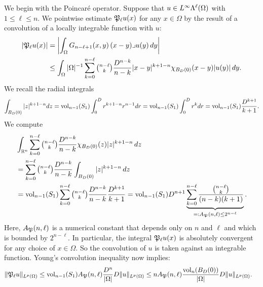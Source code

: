 \documentclass[12pt,a4paper]{article}
\begin{document}
We begin with the Poincar\'e operator. 
Suppose that $u \in L^{\infty}\Lambda^{\ell}(\Omega)$ with $1 \leq \ell \leq n$.
We pointwise estimate ${\mathfrak P}_{\ell} u(x)$ for any $x \in \Omega$ by the result of a convolution of a locally integrable function with $u$:
\begin{align*}
    \left| {\mathfrak P}_{\ell} u(x) \right|
    &=
    \left| 
        \int_{\Omega} G_{n-\ell+1}(x,y) \,(x-y)\lrcorner u(y)\,dy
    \right| 
    \\&\leq 
    \int_{\Omega} |\Omega|^{-1} \sum_{k=0}^{ n-\ell }\tbinom{ n-\ell }{k} \frac{ D^{n-k} }{n-k} |x-y|^{k+1-n} \chi_{B_D(0)}(x-y) |u(y)| \,dy
    .
\end{align*}
We recall the radial integrals 
\begin{align*}
    \int_{B_D(0)} |z|^{k+1-n} dz
    =
    \operatorname{vol}_{n-1}(S_1) \int_{0}^{D} r^{k+1-n} r^{n-1} dr
    =
    \operatorname{vol}_{n-1}(S_1) \int_{0}^{D} r^{k} dr
    =
    \operatorname{vol}_{n-1}(S_1) \frac{D^{k+1}}{k+1}
    .
\end{align*}
We compute 
\begin{align*}
    &
    \int_{{\mathbb R}^{n}} \sum_{k=0}^{n-\ell} \tbinom{n-\ell}{k} \frac{ D^{n-k} }{n-k} \chi_{B_D(0)}(z) |z|^{k+1-n} \,dz
    \\&
    =
    \sum_{k=0}^{n-\ell} \tbinom{n-\ell}{k} \frac{ D^{n-k} }{n-k} \int_{B_D(0)} |z|^{k+1-n} \,dz
    \\&
    =
    \operatorname{vol}_{n-1}(S_1) \sum_{k=0}^{n-\ell} \tbinom{n-\ell}{k} \frac{ D^{n-k} }{n-k} \frac{D^{k+1}}{k+1}
    =
    \operatorname{vol}_{n-1}(S_1) D^{n+1} \underbrace{ \sum_{k=0}^{n-\ell} \frac{ \tbinom{n-\ell}{k} }{ (n-k)(k+1) } }_{ =: A_{{\mathfrak P}}(n,\ell) \leq 2^{n-\ell}}
    .
\end{align*}
Here, $A_{{\mathfrak P}}(n,\ell)$ is a numerical constant that depends only on $n$ and $\ell$ 
and which is bounded by $2^{n-\ell}$. 
In particular, the integral ${\mathfrak P}_{\ell} u(x)$ is absolutely convergent for any choice of $x \in \Omega$. 
So the convolution of $u$ is taken against an integrable function. 
Young's convolution inequality now implies: 
\begin{align*}
    \| {\mathfrak P}_{\ell} u \|_{L^{p}(\Omega)}
    &\leq 
    \operatorname{vol}_{n-1}(S_1) A_{{\mathfrak P}}(n,\ell) \frac{ D^{n} }{|\Omega|} 
    D
    \| u \|_{L^{p}(\Omega)}
    \leq 
    n A_{{\mathfrak P}}(n,\ell) \frac{ \operatorname{vol}_{n}(B_D(0)) }{|\Omega|} 
    D
    \| u \|_{L^{p}(\Omega)}
    .
\end{align*}
\end{document}
